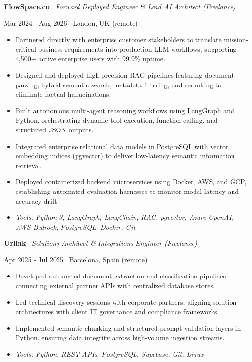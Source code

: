 \documentclass[a4paper,10pt]{article}
\newcommand{\role}[4]{%
  \vspace{2pt}\noindent
  \begin{minipage}[t]{0.70\textwidth}\raggedright\textbf{#1} \textbullet\ \textit{#3}\end{minipage}%
  \hfill
  \begin{minipage}[t]{0.28\textwidth}\raggedleft\footnotesize\color{gray}#2 \textbullet\ #4\end{minipage}%
  \vspace{1pt}%
}
\begin{document}
\role{\href{https://flowspace.co}{FlowSpace.co}}{Mar 2024 - Aug 2026}{Forward Deployed Engineer \& Lead AI Architect (Freelance)}{London, UK (remote)}
\begin{itemize}
  \item Partnered directly with enterprise customer stakeholders to translate mission-critical business requirements into production LLM workflows, supporting 4,500+ active enterprise users with 99.9\% uptime.
  \item Designed and deployed high-precision RAG pipelines featuring document parsing, hybrid semantic search, metadata filtering, and reranking to eliminate factual hallucinations.
  \item Built autonomous multi-agent reasoning workflows using LangGraph and Python, orchestrating dynamic tool execution, function calling, and structured JSON outputs.
  \item Integrated enterprise relational data models in PostgreSQL with vector embedding indices (pgvector) to deliver low-latency semantic information retrieval.
  \item Deployed containerized backend microservices using Docker, AWS, and GCP, establishing automated evaluation harnesses to monitor model latency and accuracy drift.
  \item \textit{Tools: Python 3, LangGraph, LangChain, RAG, pgvector, Azure OpenAI, AWS Bedrock, PostgreSQL, Docker, Git}
\end{itemize}

\role{Urlink}{Apr 2025 - Jul 2025}{Solutions Architect \& Integrations Engineer (Freelance)}{Barcelona, Spain (remote)}
\begin{itemize}
  \item Developed automated document extraction and classification pipelines connecting external partner APIs with centralized database stores.
  \item Led technical discovery sessions with corporate partners, aligning solution architectures with client IT governance and compliance frameworks.
  \item Implemented semantic chunking and structured prompt validation layers in Python, ensuring data integrity across high-volume ingestion streams.
  \item \textit{Tools: Python, REST APIs, PostgreSQL, Supabase, Git, Linux}
\end{itemize}
\end{document}
